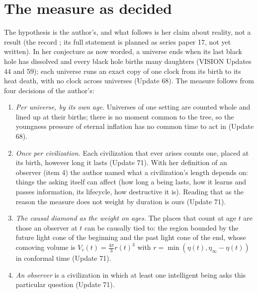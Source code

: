 \documentclass[pre,twocolumn,superscriptaddress,nofootinbib]{revtex4-2}
\begin{document}
\maketitle

\section{The measure as decided}

The hypothesis is the author's, and what follows is her claim about reality, not a result (the record \cite{repo};
its full statement is planned as series paper 17, not yet written). In her conjecture as now worded, a universe ends
when its last black hole has dissolved and every black hole births many daughters (VISION Updates 44 and 59); each
universe runs an exact copy of one clock from its birth to its heat death, with no clock across universes (Update 68).
The measure follows from four decisions of the author's:

\begin{enumerate}
\item \emph{Per universe, by its own age.} Universes of one setting are counted whole and lined up at their births;
there is no moment common to the tree, so the youngness pressure of eternal inflation \cite{Freivogel11,BFY08} has no
common time to act in (Update 68).
\item \emph{Once per civilization.} Each civilization that ever arises counts one, placed at its birth, however long it
lasts (Update 71). With her definition of an observer (item 4) the author named what a civilization's length depends
on: things the asking itself can affect (how long a being lasts, how it learns and passes information, its lifecycle,
how destructive it is). Reading that as the reason the measure does not weight by duration is ours (Update 71).
\item \emph{The causal diamond as the weight on ages.} The places that count at age $t$ are those an observer at $t$ can
be causally tied to: the region bounded by the future light cone of the beginning and the past light cone of the end,
whose comoving volume is $V_c(t) = \tfrac{4\pi}{3} r(t)^3$ with $r = \min(\eta(t), \eta_\infty - \eta(t))$ in conformal
time \cite{BHKP07} (Update 71).
\item \emph{An observer} is a civilization in which at least one intelligent being asks this particular question
(Update 71).
\end{enumerate}
\end{document}
